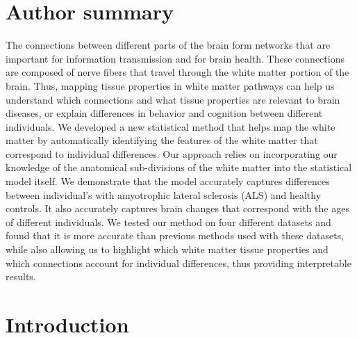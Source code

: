 \documentclass[10pt,letterpaper]{article}
\begin{document}
\section*{Author summary}
The connections between different parts of the brain form networks that are
important for information transmission and for brain health. These connections
are composed of nerve fibers that travel through the white matter portion of the
brain. Thus, mapping tissue properties in white matter pathways can help us
understand which connections and what tissue properties are relevant to brain
diseases, or explain differences in behavior and cognition between different
individuals. We developed a new statistical method that helps map the white
matter by automatically identifying the features of the white matter that
correspond to individual differences. Our approach relies on incorporating our
knowledge of the anatomical sub-divisions of the white matter into the
statistical model itself. We demonstrate that the model accurately captures
differences between individual's with amyotrophic lateral sclerosis (ALS) and
healthy controls. It also accurately captures brain changes that correspond with
the ages of different individuals. We tested our method on four different
datasets and found that it is more accurate than previous methods used with
these datasets, while also allowing us to highlight which white matter tissue
properties and which connections account for individual differences, thus
providing interpretable results.
\linenumbers

\section*{Introduction}
\end{document}
